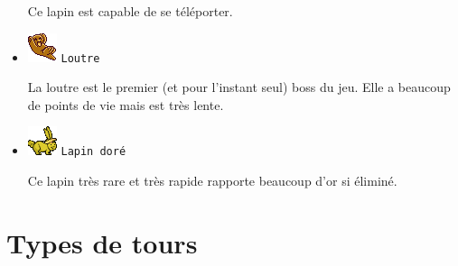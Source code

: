 \documentclass{article}
\begin{document}
\begin{itemize}
Ce lapin est capable de se t\'el\'eporter.

\item \includegraphics{otter.png} \texttt{Loutre}

La loutre est le premier (et pour l'instant seul) boss du jeu. Elle a beaucoup
de points de vie mais est tr\`es lente.

\item \includegraphics{goldenbunny_alt1.png} \texttt{Lapin dor\'e}

Ce lapin tr\`es rare et tr\`es rapide rapporte beaucoup d'or si \'elimin\'e.

\end{itemize}

\section{Types de tours}
\end{document}
